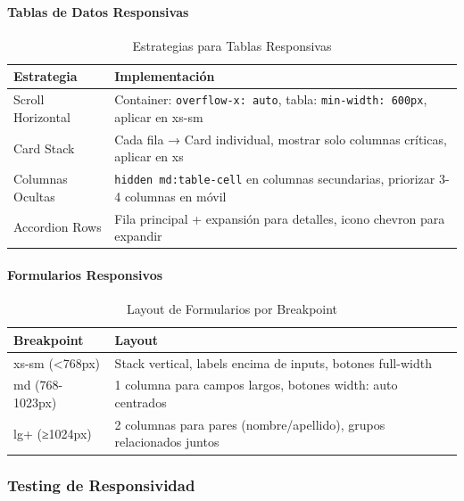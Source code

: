 \documentclass[12pt,a4paper,oneside]{article}
\begin{document}
\paragraph{Tablas de Datos Responsivas}

\begin{table}[h]
\centering
\caption{Estrategias para Tablas Responsivas}
\label{tab:tablas-responsive}
\small
\begin{tabular}{|l|p{9cm}|}
\hline
\textbf{Estrategia} & \textbf{Implementación} \\
\hline
Scroll Horizontal & Container: \texttt{overflow-x: auto}, tabla: \texttt{min-width: 600px}, aplicar en xs-sm \\
\hline
Card Stack & Cada fila → Card individual, mostrar solo columnas críticas, aplicar en xs \\
\hline
Columnas Ocultas & \texttt{hidden md:table-cell} en columnas secundarias, priorizar 3-4 columnas en móvil \\
\hline
Accordion Rows & Fila principal + expansión para detalles, icono chevron para expandir \\
\hline
\end{tabular}
\end{table}

\paragraph{Formularios Responsivos}

\begin{table}[h]
\centering
\caption{Layout de Formularios por Breakpoint}
\label{tab:forms-responsive}
\small
\begin{tabular}{|l|p{9cm}|}
\hline
\textbf{Breakpoint} & \textbf{Layout} \\
\hline
xs-sm (<768px) & Stack vertical, labels encima de inputs, botones full-width \\
\hline
md (768-1023px) & 1 columna para campos largos, botones width: auto centrados \\
\hline
lg+ (≥1024px) & 2 columnas para pares (nombre/apellido), grupos relacionados juntos \\
\hline
\end{tabular}
\end{table}

\subsubsection{Testing de Responsividad}
\end{document}
